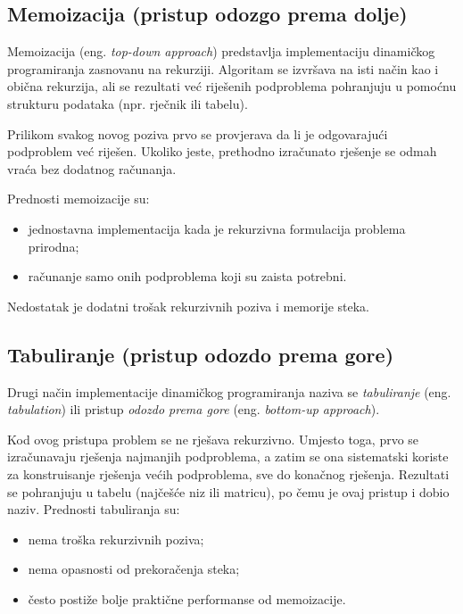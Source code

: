 \subsection{Memoizacija (pristup odozgo prema dolje)}

Memoizacija (eng. \emph{top-down approach}) predstavlja implementaciju dinamičkog programiranja zasnovanu na rekurziji. Algoritam se izvršava na isti način kao i obična rekurzija, ali se rezultati već riješenih podproblema pohranjuju u pomoćnu strukturu podataka (npr. rječnik ili tabelu).

Prilikom svakog novog poziva prvo se provjerava da li je odgovarajući podproblem već riješen. Ukoliko jeste, prethodno izračunato rješenje se odmah vraća bez dodatnog računanja.

\medskip

Prednosti memoizacije su:

\begin{itemize}
	\item jednostavna implementacija kada je rekurzivna formulacija problema prirodna;
	\item računanje samo onih podproblema koji su zaista potrebni.
\end{itemize}

Nedostatak je dodatni trošak rekurzivnih poziva i memorije steka.

\subsection*{Tabuliranje (pristup odozdo prema gore)}

Drugi način implementacije dinamičkog programiranja naziva se \textit{tabuliranje} (eng. \emph{tabulation}) ili pristup \textit{odozdo prema gore} (eng. \emph{bottom-up approach}).

Kod ovog pristupa problem se ne rješava rekurzivno. Umjesto toga, prvo se izračunavaju rješenja najmanjih podproblema, a zatim se ona sistematski koriste za konstruisanje rješenja većih podproblema, sve do konačnog rješenja.  Rezultati se pohranjuju u tabelu (najčešće niz ili matricu), po čemu je ovaj pristup i dobio naziv.  Prednosti tabuliranja su:

\begin{itemize}
	\item nema troška rekurzivnih poziva;
	\item nema opasnosti od prekoračenja steka;
	\item često postiže bolje praktične performanse od memoizacije.
\end{itemize}

